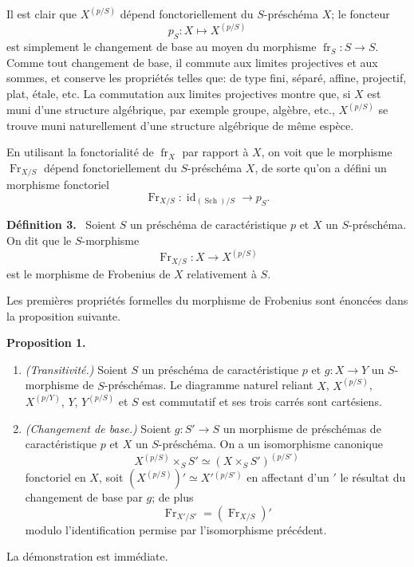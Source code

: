 \documentclass[11pt]{article}
\newenvironment{statement}[1]{\par\medskip\noindent\textbf{#1.}\ }{\par\medskip}
\providecommand{\id}{\operatorname{id}}
\providecommand{\id}{\operatorname{id}}
\providecommand{\id}{\operatorname{id}}
\providecommand{\id}{\operatorname{id}}
\providecommand{\id}{\operatorname{id}}
\providecommand{\fr}{\operatorname{fr}}
\providecommand{\Fr}{\operatorname{Fr}}
\providecommand{\Sch}{\operatorname{Sch}}
\begin{document}
Il est clair que $X^{(p/S)}$ dépend fonctoriellement du $S$-préschéma $X$; le foncteur
\[
p_S:X\longmapsto X^{(p/S)}
\]
est simplement le changement de base au moyen du morphisme $\fr_S:S\to S$. Comme tout changement de base, il commute aux limites projectives et aux sommes, et conserve les propriétés telles que: de type fini, séparé, affine, projectif, plat, étale, etc. La commutation aux limites projectives montre que, si $X$ est muni d'une structure algébrique, par exemple groupe, algèbre, etc., $X^{(p/S)}$ se trouve muni naturellement d'une structure algébrique de même espèce.

En utilisant la fonctorialité de $\fr_X$ par rapport à $X$, on voit que le morphisme $\Fr_{X/S}$ dépend fonctoriellement du $S$-préschéma $X$, de sorte qu'on a défini un morphisme fonctoriel
\[
\Fr_{X/S}:\id_{(\Sch)/S}\longrightarrow p_S.
\]

\begin{statement}{Définition 3}
Soient $S$ un préschéma de caractéristique $p$ et $X$ un $S$-préschéma. On dit que le $S$-morphisme
\[
\Fr_{X/S}:X\longrightarrow X^{(p/S)}
\]
est le morphisme de Frobenius de $X$ relativement à $S$.
\end{statement}

Les premières propriétés formelles du morphisme de Frobenius sont énoncées dans la proposition suivante.

\begin{statement}{Proposition 1}
\begin{enumerate}[label=\alph*)]
\item \emph{(Transitivité.)} Soient $S$ un préschéma de caractéristique $p$ et $g:X\to Y$ un $S$-morphisme de $S$-préschémas. Le diagramme naturel reliant $X$, $X^{(p/S)}$, $X^{(p/Y)}$, $Y$, $Y^{(p/S)}$ et $S$ est commutatif et ses trois carrés sont cartésiens.

\item \emph{(Changement de base.)} Soient $g:S'\to S$ un morphisme de préschémas de caractéristique $p$ et $X$ un $S$-préschéma. On a un isomorphisme canonique
\[
X^{(p/S)}\times_S S'\simeq (X\times_S S')^{(p/S')}
\]
fonctoriel en $X$, soit $(X^{(p/S)})'\simeq X'{}^{(p/S')}$ en affectant d'un $'$ le résultat du changement de base par $g$; de plus
\[
\Fr_{X'/S'}=(\Fr_{X/S})'
\]
modulo l'identification permise par l'isomorphisme précédent.
\end{enumerate}
\end{statement}

La démonstration est immédiate.
\end{document}
